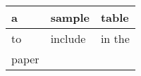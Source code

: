 \begin{tabular}{lll}
  a & sample & table \\ \hline
  to & include & in the \\
  paper & & \\ \hline
\end{tabular}